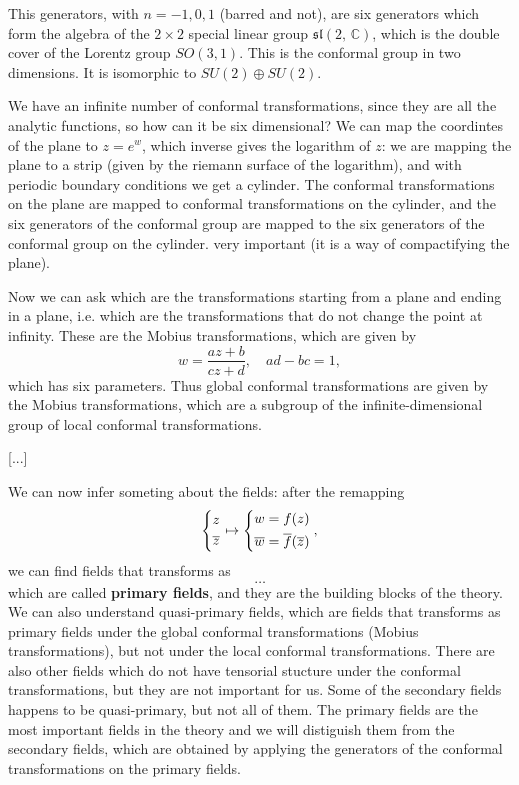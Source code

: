 This generators, with \(n = -1,0,1\) (barred and not), are six generators which form the algebra of the \(2\times 2\) special linear group \(\mathfrak{sl}(2, \, \mathbb{C})\), which is the double cover of the Lorentz group \(SO(3,1)\). This is the conformal group in two dimensions. It is isomorphic to \(SU(2)\oplus SU(2)\).

We have an infinite number of conformal transformations, since they are all the analytic functions, so how can it be six dimensional? We can map the coordintes of the plane to \(z=e^{w}\), which inverse gives the logarithm of \(z\): we are mapping the plane to a strip (given by the riemann surface of the logarithm), and with periodic boundary conditions we get a cylinder. The conformal transformations on the plane are mapped to conformal transformations on the cylinder, and the six generators of the conformal group are mapped to the six generators of the conformal group on the cylinder. very important (it is a way of compactifying the plane).

Now we can ask which are the transformations starting from a plane and ending in a plane, i.e. which are the transformations that do not change the point at infinity. These are the Mobius transformations, which are given by
\[
    w = \frac{az + b}{cz + d}, \quad ad - bc = 1,
\]
which has six parameters. Thus global conformal transformations are given by the Mobius transformations, which are a subgroup of the infinite-dimensional group of local conformal transformations.

    [...]

We can now infer someting about the fields: after the remapping
\[
    \begin{dcases}
        z \\
        \overline{z}
    \end{dcases} \mapsto \begin{dcases}
        w = f(z) \\
        \overline{w} = \overline{f}(\overline{z})
    \end{dcases},
\]
we can find fields that transforms as
\[
    \dots
\]
which are called \textbf{primary fields}, and they are the building blocks of the theory. We can also understand quasi-primary fields, which are fields that transforms as primary fields under the global conformal transformations (Mobius transformations), but not under the local conformal transformations. There are also other fields which do not have tensorial stucture under the conformal transformations, but they are not important for us. Some of the secondary fields happens to be quasi-primary, but not all of them. The primary fields are the most important fields in the theory and we will distiguish them from the secondary fields, which are obtained by applying the generators of the conformal transformations on the primary fields.

